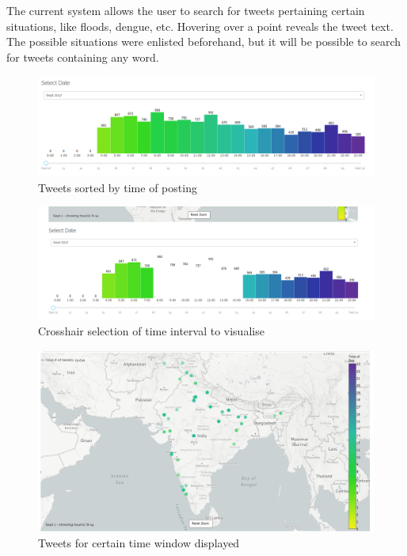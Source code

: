 \documentclass[journal, a4paper]{IEEEtran}
\begin{document}
The current system allows the user to search for tweets pertaining certain situations, like floods, dengue, etc. Hovering over a point reveals the tweet text. The possible situations were enlisted beforehand, but it will be possible to search for tweets containing any word.

\begin{figure}[h!]
\centering
\includegraphics[width=\columnwidth]{bar_chart.png}
\caption{Tweets sorted by time of posting}
\label{fig:barchart}
\end{figure}


\begin{figure}[h!]
\centering
\includegraphics[width=\columnwidth]{bar_chart_specific.png}
\caption{Crosshair selection of time interval to visualise}
\label{fig:barchart_specific}
\end{figure}


\begin{figure}[h!]
\centering
\includegraphics[width=\columnwidth]{map_specific.png}
\caption{ Tweets for certain time window displayed}
\label{fig:map_specific}
\end{figure}
\end{document}
